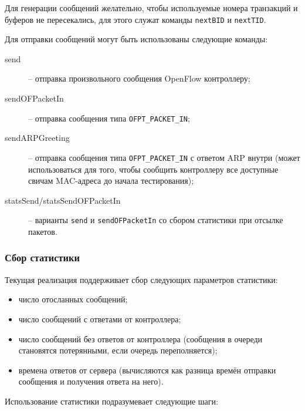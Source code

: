 \documentclass[9pt,a4paper]{article}
\begin{document}
Для генерации сообщений желательно, чтобы используемые номера транзакций и
буферов не пересекались, для этого служат команды \lstinline!nextBID! и
\lstinline!nextTID!.

Для отправки сообщений могут быть использованы следующие команды:

\begin{description}

  \item[send] -- отправка произвольного сообщения OpenFlow контроллеру;

  \item[sendOFPacketIn] -- отправка сообщения типа \lstinline!OFPT_PACKET_IN!;

  \item[sendARPGreeting] -- отправка сообщения типа \lstinline!OFPT_PACKET_IN!
    с ответом ARP внутри (может использоваться для того, чтобы сообщить
    контроллеру все доступные свичам MAC-адреса до начала тестирования);

  \item[statsSend/statsSendOFPacketIn] -- варианты \lstinline!send! и
    \lstinline!sendOFPacketIn! со сбором статистики при отсылке пакетов.

\end{description}

\subsubsection{Сбор статистики}

Текущая реализация поддерживает сбор следующих параметров статистики:

\begin{itemize}
  \item число отосланных сообщений;
  \item число сообщений с ответами от контроллера;
  \item число сообщений без ответов от контроллера (сообщения в очереди
    становятся потерянными, если очередь переполняется);
  \item времена ответов от сервера (вычисляются как разница времён отправки
    сообщения и получения ответа на него).
\end{itemize}

Использование статистики подразумевает следующие шаги:
\end{document}
